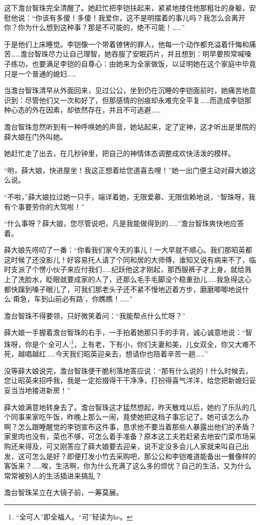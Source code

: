 \par 这下澹台智珠完全清醒了。她赶忙把李铠扶起来，紧紧地搂住他那粗壮的身躯，安慰他说：“你该有多傻！多傻！我爱你，这不是明摆着的事儿吗？我怎么会离开你？你为什么想到这种事？那是不可能的，绝不可能！……”
\par 于是他们上床睡觉。李铠像一个带着镣铐的罪人，他每一个动作都充溢着忏悔和痛苦……澹台智珠尽力让自己理智，她吞服了安眠药片，并且想到：明早要照常喊嗓子练功，也要满足李铠的自尊心：由她来为全家做饭，以证明她在这个家庭中毕竟只是一个普通的媳妇……
\par 当澹台智珠清早从外面回来，见过公公，坐到仍在沉睡的李铠面前时，她痛苦地意识到：尽管他们又一次和好了，但那感情的创痕却永难完全平复……而造成李铠那种心态的外在因素，却依然存在，并且不可逃避……
\par 澹台智珠忽然听到有一种呼唤她的声音，她站起来，定了定神，这才听出是里院的薛大娘在门外叫她。
\par 她赶忙走了出去，在几秒钟里，把自己的神情体态调整成欢快活泼的模样。
\par “哟，薛大娘，快进屋坐！我这正想着给您道喜去哩！”她一出门便主动对薛大娘这么说。
\par “不啦，”薛大娘拉过她一只手，端详着她，无限爱慕、无限信赖地说，“智珠呀，我有个事要劳你的大驾啦！”
\par “什么事呀？薛大娘，您尽管说吧，凡是我能做得到的……”澹台智珠爽快地应答着。
\par 薛大娘先唠叨了一番：“你看我们家今天的事儿！一大早就不顺心。我们那昭英都这时候了还没影儿！好容易托人请了个同和居的大师傅，谁知又说有病来不了，临时支派了个愣小伙子来应付我们……纪跃他这才刚起，那西服裤子才上身，就给溅上了洗脸水，眨眼就要成家的人了，还那么毛手毛脚没个稳重劲儿……我急得这心都快蹿到嗓子眼儿了，可我们那老头子还不紧不慢地迈着方步，磨磨唧唧地说什么‘甭急，车到山前必有路’，你瞧瞧！……”
\par 澹台智珠不得要领，只好微笑着问：“我能帮点什么忙呀？”
\par 薛大娘一手握着澹台智珠的右手，一手拍着她那只手的手背，诚心诚意地说：“智珠呀，你是个‘全可人’\footnote{“全可人”即全福人。“可”轻读为ke。}，上有老，下有小，你们夫妻和美，儿女双全，你又大难不死，越唱越红……今天我们昭英迎亲去，想请你也陪着辛苦一趟……”
\par 没等薛大娘说完，澹台智珠便干脆利落地答应说：“那有什么说的！什么时候去，您让昭英来招呼我，我是一定拾掇得干干净净，打扮得喜气洋洋，给您把新媳妇妥妥当当地接进新房！”
\par 薛大娘满意地转身去了。澹台智珠这才猛然想起，昨天散戏以后，她约了乐队的几个同事来家吃午饭，昨晚上那么一闹，竟使她把这档子事忘记了。她可该怎么办啊？怎么跟睡醒觉的李铠宣布这件事，恳求他不要当着那些人暴露出他们的矛盾？家里肉也没有，菜也不够，可怎么着手准备？原本这工夫若赶紧去地安门菜市场采购还来得及，可又刚答应了薛大娘要去迎亲，说不定没多会儿人家就来叫自己出发，这可怎么是好？即便打发小竹去采购吧，那公公和李铠难道能备出一餐像样的客饭来？……唉，生活啊，你为什么充满了这么多的烦忧？自己的生活，又为什么常常被别人的生活插进来搞乱？
\par 澹台智珠呆立在大镜子前，一筹莫展。


